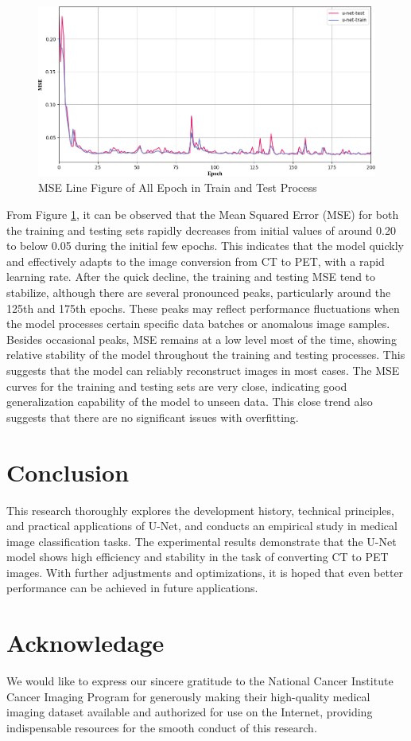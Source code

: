 \documentclass[twocolumn]{article}
\begin{document}
\begin{figure}[h]
	\centering
	\includegraphics[width=1.0\linewidth]{u-net/MSE}
	\caption[mse]{MSE Line Figure of All Epoch in Train and Test Process}
	\label{fig:mse}
\end{figure}

From Figure \ref{fig:mse}, it can be observed that the Mean Squared Error (MSE) for both the training and testing sets rapidly decreases from initial values of around 0.20 to below 0.05 during the initial few epochs. This indicates that the model quickly and effectively adapts to the image conversion from CT to PET, with a rapid learning rate. After the quick decline, the training and testing MSE tend to stabilize, although there are several pronounced peaks, particularly around the 125th and 175th epochs. These peaks may reflect performance fluctuations when the model processes certain specific data batches or anomalous image samples. Besides occasional peaks, MSE remains at a low level most of the time, showing relative stability of the model throughout the training and testing processes. This suggests that the model can reliably reconstruct images in most cases. The MSE curves for the training and testing sets are very close, indicating good generalization capability of the model to unseen data. This close trend also suggests that there are no significant issues with overfitting.


\section{Conclusion}
This research thoroughly explores the development history, technical principles, and practical applications of U-Net, and conducts an empirical study in medical image classification tasks. The experimental results demonstrate that the U-Net model shows high efficiency and stability in the task of converting CT to PET images. With further adjustments and optimizations, it is hoped that even better performance can be achieved in future applications.

\section*{Acknowledage}
We would like to express our sincere gratitude to the National Cancer Institute Cancer Imaging Program for generously making their high-quality medical imaging dataset available and authorized for use on the Internet, providing indispensable resources for the smooth conduct of this research.



\end{document}
